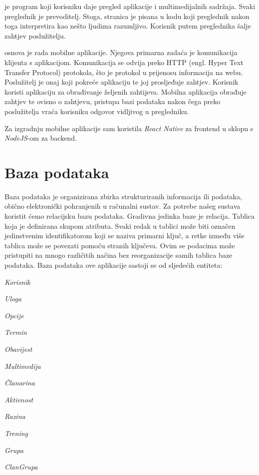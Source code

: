 \documentclass[times, utf8, zavrsni]{fer}
\newenvironment{packed_item}{
	\begin{itemize}
		\setlength{\itemsep}{0pt}
		\setlength{\parskip}{0pt}
		\setlength{\parsep}{0pt}
	}{\end{itemize}}
\begin{document}
    		\space {} je program koji korisniku daje pregled aplikacije i multimedijalnih sadržaja. Svaki preglednik je prevoditelj. Stoga, stranica je pisana u kodu koji preglednik nakon toga interpretira kao nešto ljudima razumljivo. Korisnik putem preglednika šalje zahtjev poslužitelju.
    		
    		\space {} osnova je rada mobilne aplikacije. Njegova primarna zadaća je komunikacija klijenta s aplikacijom. Komunikacija se odvija preko HTTP (engl. Hyper Text Transfer Protocol) protokola, što je protokol u prijenosu informacija na webu. Poslužitelj je onaj koji pokreće aplikaciju te joj prosljeđuje zahtjev. Korisnik koristi aplikaciju za obrađivanje željenih zahtijeva. Mobilna aplikacija obrađuje zahtjev te ovisno o zahtjevu, pristupa bazi podataka nakon čega preko poslužitelja vraća korisniku odgovor vidljivog u pregledniku.
    		
    		\space \noindent Za izgradnju mobilne aplikacije sam koristila \textit{React Native} za frontend u sklopu s \textit{NodeJS}-om za backend. 
    		
    				
    \section{Baza podataka}
    			
    			\noindent Baza podataka je organizirana zbirka strukturiranih informacija ili podataka, obično elektronički pohranjenih u računalni sustav. Za potrebe našeg sustava koristit ćemo relacijsku bazu podataka. Gradivna jedinka baze je relacija. Tablica koja je definirana skupom atributa. Svaki redak u tablici može biti označen jedinstvenim identifikatorom koji se naziva primarni ključ, a retke između više tablica može se povezati pomoću stranih ključeva. Ovim se podacima može pristupiti na mnogo različitih načina bez reorganizacije samih tablica baze podataka. Baza podataka ove aplikacije sastoji se od sljedećih entiteta:
    
    	\begin{packed_item}
    		\item 	\textit{Korisnik}
    		\item 	\textit{Uloga}
    		\item 	\textit{Opcije}	
    		\item 	\textit{Termin}
    		\item 	\textit{Obavijest}
    		\item 	\textit{Multimedija}
    		\item 	\textit{Članarina}
    		\item 	\textit{Aktivnost}	
    		\item 	\textit{Razina}
    		\item 	\textit{Trening}
    		\item 	\textit{Grupa}
    		\item 	\textit{ClanGrupa}
    	\end{packed_item}
    	
\end{document}
